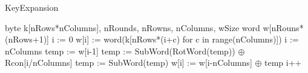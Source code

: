 \documentclass[10pt,a4paper,twoside]{llncs}
\begin{document}
\begin{algorithm}
 \caption{KeyExpansion}
 \label{alg:keyExpansion}
 \begin{algorithmic}[1]
  \REQUIRE byte k[nRows*nColumns], nRounds, nRowns, nColumns, wSize
  \ENSURE word w[nRouns*(nRows+1)]
  \STATE i := 0
    \STATE w[i] := word(k[nRows*(i+c) for c in range(nColumns)])
  \ENDWHILE
  \STATE i := nColumns
    \STATE temp := w[i-1]
      \STATE temp := SubWord(RotWord(temp)) $\oplus$ Rcon[i/nColumns]
    \ELSE
      \STATE temp := SubWord(temp)
    \ENDIF
    \STATE w[i] := w[i-nColumns] $\oplus$ temp
    \STATE i++
  \ENDWHILE
 \end{algorithmic}
\end{algorithm}

\end{document}
